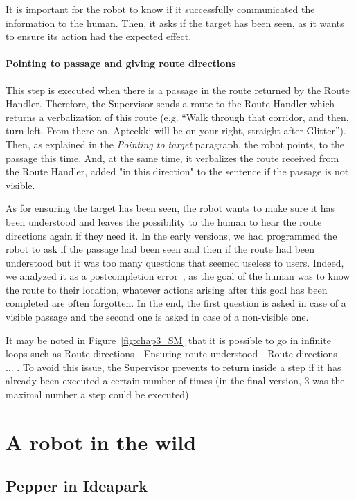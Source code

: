 \documentclass[a4paper,11pt,twoside]{StyleThese}
\begin{document}
It is important for the robot to know if it successfully communicated the information to the human. Then, it asks if the target has been seen, as it wants to ensure its action had the expected effect.

\paragraph{Pointing to passage and giving route directions}\label{par:route_understood}
This step is executed when there is a passage in the route returned by the Route Handler. Therefore, the Supervisor sends a route to the Route Handler which returns a verbalization of this route (e.g. ``Walk through that corridor, and then, turn left. From there on, Apteekki will be on your right, straight after Glitter''). Then, as explained in the \textit{Pointing to target} paragraph, the robot points, to the passage this time. And, at the same time, it verbalizes the route received from the Route Handler, added "in this direction" to the sentence if the passage is not visible.

As for ensuring the target has been seen, the robot wants to make sure it has been understood and leaves the possibility to the human to hear the route directions again if they need it. In the early versions, we had programmed the robot to ask if the passage had been seen and then if the route had been understood but it was too many questions that seemed useless to users. Indeed, we analyzed it as a postcompletion error~\cite{byrne_1997}, as the goal of the human was to know the route to their location, whatever actions arising after this goal has been completed are often forgotten. In the end, the first question is asked in case of a visible passage and the second one is asked in case of a non-visible one.

It may be noted in Figure~\ref{fig:chap3_SM} that it is possible to go in infinite loops such as Route directions - Ensuring route understood - Route directions - ... . To avoid this issue, the Supervisor prevents to return inside a step if it has already been executed a certain number of times (in the final version, 3 was the maximal number a step could be executed).

\section{A robot in the wild}


\subsection{Pepper in Ideapark}
\end{document}
